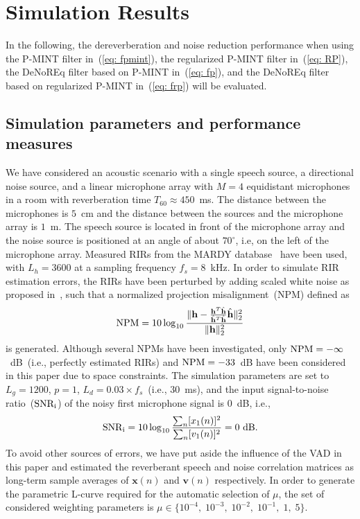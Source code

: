 \documentclass{article}
\begin{document}
\section{Simulation Results}
\label{sec: exp}
In the following, the dereverberation and noise reduction performance when using the P-MINT filter in~(\ref{eq: fpmint}), the regularized P-MINT filter in~(\ref{eq: RP}), the DeNoREq filter based on P-MINT in~(\ref{eq: fp}), and the DeNoREq filter based on regularized P-MINT in~(\ref{eq: frp}) will be evaluated.


\subsection{Simulation parameters and performance measures}
We have considered an acoustic scenario with a single speech source, a directional noise source, and a linear microphone array with $M = 4$ equidistant microphones in a room with reverberation time $T_{60} \approx 450$~ms.
The distance between the microphones is $5$~cm and the distance between the sources and the microphone array is $1$~m.
The speech source is located in front of the microphone array and the noise source is positioned at an angle of about $70^{\circ}$, i.e, on the left of the microphone array.
Measured RIRs from the MARDY database~\cite{Wen_IWAENC_2006} have been used, with $L_h = 3600$ at a sampling frequency $f_s = 8$~kHz.
In order to simulate RIR estimation errors, the RIRs have been perturbed by adding scaled white noise as proposed in~\cite{Zhang_2008}, such that a normalized projection misalignment~(NPM) defined as
\begin{equation}
{\rm NPM} = 10 \log_{10} \frac{\|\mathbf{h} - \frac{\mathbf{h}^T\hat{\mathbf{h}}}{\hat{\mathbf{h}}^T\hat{\mathbf{h}}}\hat{\mathbf{h}} \|_2^2}{\| \mathbf{h}\|_2^2}
\end{equation}
is generated.
Although several NPMs have been investigated, only ${\rm NPM} = -\infty$~dB~(i.e., perfectly estimated RIRs) and ${\rm NPM} = -33$~dB have been considered in this paper due to space constraints.
The simulation parameters are set to $L_g = 1200$, $p=1$, $L_d = 0.03 \times f_s$~(i.e., $30$~ms), and the input signal-to-noise ratio~($ \rm SNR_i$) of the noisy first microphone signal is $0$~dB, i.e.,
\begin{equation}
  {\rm SNR}_{\rm i} = 10 \log_{10} \frac{\sum_n [x_1(n)]^2}{\sum_n [v_1(n)]^2} = 0~{\rm dB}.
\end{equation}
To avoid other sources of errors, we have put aside the influence of the VAD in this paper and estimated the reverberant speech and noise correlation matrices as long-term sample averages of $\mathbf{x}(n)$ and $\mathbf{v}(n)$ respectively.
In order to generate the parametric L-curve required for the automatic selection of $\mu$, the set of considered weighting parameters is $\mu \in \{10^{-4}, \; 10^{-3}, \; 10^{-2}, \; 10^{-1}, \; 1, \; 5 \}$.
\end{document}

